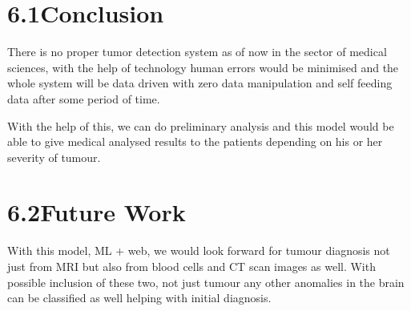 \documentclass[oneside,a4paper,12pt]{book}
\begin{document}
\vspace{\baselineskip}

\vspace{\baselineskip}

\vspace{\baselineskip}

\vspace{\baselineskip}

\vspace{\baselineskip}

\vspace{\baselineskip}

\vspace{\baselineskip}

\vspace{\baselineskip}

\vspace{\baselineskip}

\vspace{\baselineskip}
\vspace{\baselineskip}\section*{6.1\hspace*{10pt}Conclusion }
There is no proper tumor detection system as of now in the sector of medical
sciences, with the help of technology human errors would be minimised and the
whole system will be data driven with zero data manipulation and self feeding
data after some period of time.
\par With the help of this, we can do preliminary analysis and this model would be able
to give medical analysed results to the patients depending on his or her severity
of tumour.


\vspace{\baselineskip}\section*{6.2\hspace*{10pt}Future Work }
\par With this model, ML + web, we would look forward for tumour diagnosis not just
from MRI but also from blood cells and CT scan images as well.
With possible inclusion of these two, not just tumour any other anomalies in the
brain can be classified as well helping with initial diagnosis.
\vspace{\baselineskip}
\end{document}
